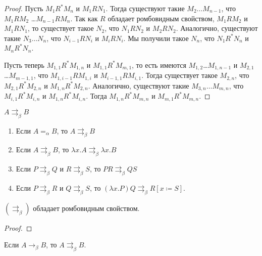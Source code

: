\begin{proof}
    Пусть $M_1 R^{*} M_n$ и $M_1 R N_1$. Тогда существуют такие $M_2 \ldots M_{n-1}$, что $M_1 R M_2$ \ldots $M_{n-1} R M_n$.
    Так как $R$ обладает ромбовидным свойством, $M_1 R M_2$ и $M_1 R N_1$, то существует такое $N_2$,
    что $N_1 R N_2$ и $M_2 R N_2$. Аналогично, существуют такие $N_3 \ldots N_n$, что $N_{i-1} R N_{i}$ и $M_i R N_i$.
    Мы получили такое $N_n$, что $N_1 R^{*} N_n$ и $M_n R^{*} N_n$.

    Пусть теперь $M_{1,1}R^{*}M_{1,n}$ и $M_{1,1}R^{*}M_{m,1}$, то есть имеются $M_{1,2}$\ldots$M_{1,n-1}$ и $M_{2,1}$\ldots$M_{m-1,1}$,
    что $M_{1,i-1} R M_{1,i}$ и $M_{i-1, 1} R M_{i, 1}$.
    Тогда существует такое $M_{2,n}$, что $M_{2,1} R^{*} M_{2,n}$ и $M_{1,n} R^{*} M_{2,n}$.
    Аналогично, существуют такие $M_{3,n}\ldots M_{m,n}$, что $M_{i,1} R^{*} M_{i,n}$ и $M_{1,n} R^{*} M_{i,n}$.
    Тогда $M_{1,n} R^{*} M_{m,n}$ и $M_{m,1} R^{*} M_{m,n}$.
\end{proof}

\begin{definition}
    $A \rightrightarrows_{\beta} B$
    \begin{enumerate}
        \item Если $A =_\alpha B$, то $A \rightrightarrows_{\beta}B$
        \item Если $A \rightrightarrows_{\beta} B$, то $\lambda x.A \rightrightarrows_{\beta} \lambda x . B$
        \item Если $P \rightrightarrows_{\beta} Q$ и $R \rightrightarrows_{\beta} S$, то $PR \rightrightarrows_{\beta} QS$
        \item Если $P \rightrightarrows_{\beta}R$ и $Q \rightrightarrows_{\beta} S$,
            то $(\lambda x . P) Q \rightrightarrows_{\beta} R [x\coloneqq{}S]$.
    \end{enumerate}
\end{definition}

\begin{statement} \label{st-star}
    $(\rightrightarrows_{\beta})$ обладает ромбовидным свойством.
\end{statement}

\begin{proof}
    \todo %
\end{proof}

\begin{statement} \label{st-A}
    Если $A \rightarrow_{\beta} B$, то $A \rightrightarrows_{\beta} B$.
\end{statement}


